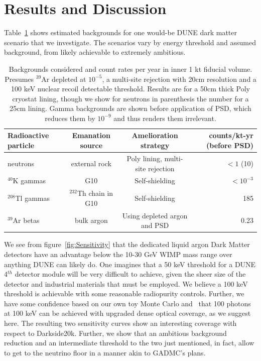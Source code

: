 \documentclass[a4paper,11pt]{article}
\begin{document}
\section{Results and Discussion}

Table~\ref{table:DUNE} shows estimated backgrounds for one would-be DUNE dark matter scenario that we investigate. The scenarios vary by energy threshold and assumed background, from likely achievable to extremely ambitious. 


\begin{table}[h]
\begin{tabular}{ l c c r}
 Radioactive particle & Emanation source & Amelioration strategy & counts/kt-yr (before PSD)\\
\hline
 neutrons  & external rock & Poly lining, multi-site rejection & $< 1$ (10)\\
  $^{40}$K gammas &  G10 & Self-shielding & $< 10^{-3}$ \\
$^{208}$Tl gammas & $^{232}$Th chain in G10 & Self-shielding & 185\\
 $^{39}$Ar betas & bulk argon & Using depleted argon and PSD & 0.23  \\
\end{tabular}
\label{table:DUNE}
\caption{Backgrounds considered and count rates per year in inner 1 kt fiducial volume. Presumes $^{39}$Ar depleted at $10^{-5}$, a multi-site rejection with 20cm resolution and a 100 keV nuclear recoil detectable threshold. Results are for a 50cm thick Poly cryostat lining, though we show for neutrons in parenthesis the number for a 25cm lining. Gamma backgrounds are shown before application of PSD, which reduces them by $10^{-9}$ and thus renders them irrelevant.}
\end{table}

We see from figure~\ref{fig:Sensitivity} that the dedicated liquid argon Dark Matter detectors have an advantage below the 10-30 GeV WIMP mass range over anything DUNE can likely do. One imagines that a 50 keV threshold for a DUNE 4$^{th}$ detector module will be very difficult to achieve, given the sheer size of the detector and industrial materials that must be employed. We believe a 100 keV threshold is achievable with some reasonable radiopurity controls. Further, we have some confidence based on our own toy Monte Carlo and~\cite{privateconv:flavio} that 100 photons at 100 keV can be achieved with upgraded dense optical coverage, as we suggest here. The resulting two sensitivity curves show an interesting coverage with respect to Darkside20k. Further, we show that an ambitious background reduction and an intermediate threshold to the two just mentioned, in fact, allow to get to the neutrino floor in a manner akin to GADMC's plans.
\end{document}
